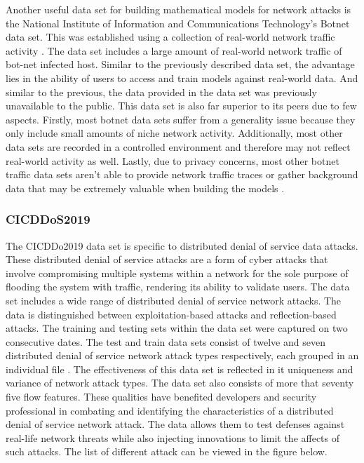\documentclass{article}
\begin{document}
Another useful data set for building mathematical models for network attacks is the National Institute of Information and Communications Technology's Botnet data set. This was established using a collection of real-world network traffic activity \cite{NIMS2018}. The data set includes a large amount of real-world network traffic of bot-net infected host. Similar to the previously described data set, the advantage lies in the ability of users to access and train models against real-world data. And similar to the previous, the data provided in the data set was previously unavailable to the public. This data set is also far superior to its peers due to few aspects. Firstly, most botnet data sets suffer from a generality issue because they only include small amounts of niche network activity. Additionally, most other data sets are recorded in a controlled environment and therefore may not reflect real-world activity as well. Lastly, due to privacy concerns, most other botnet traffic data sets aren't able to provide network traffic traces or gather background data that may be extremely valuable when building the models \cite{beigi2014towards}.

\subsubsection{CICDDoS2019} 
The CICDDo2019 data set is specific to distributed denial of service data attacks. These distributed denial of service attacks are a form of cyber attacks that involve compromising multiple systems within a network for the sole purpose of flooding the system with traffic, rendering its ability to validate users. The data set includes a wide range of distributed denial of service network attacks\cite{sharafaldin2019developing}. The data is distinguished between exploitation-based attacks and reflection-based attacks. The training and testing sets within the data set were captured on two consecutive dates. The test and train data sets consist of twelve and seven distributed denial of service network attack types respectively, each grouped in an individual file \cite{elsayed2020ddosnet}. The effectiveness of this data set is reflected in it uniqueness and variance of network attack types. The data set also consists of more that seventy five flow features. These qualities have benefited developers and security professional in combating and identifying the characteristics of a distributed denial of service network attack. The data allows them to test defenses against real-life network threats while also injecting innovations to limit the affects of such attacks. The list of different attack can be viewed in the figure below.
\end{document}
